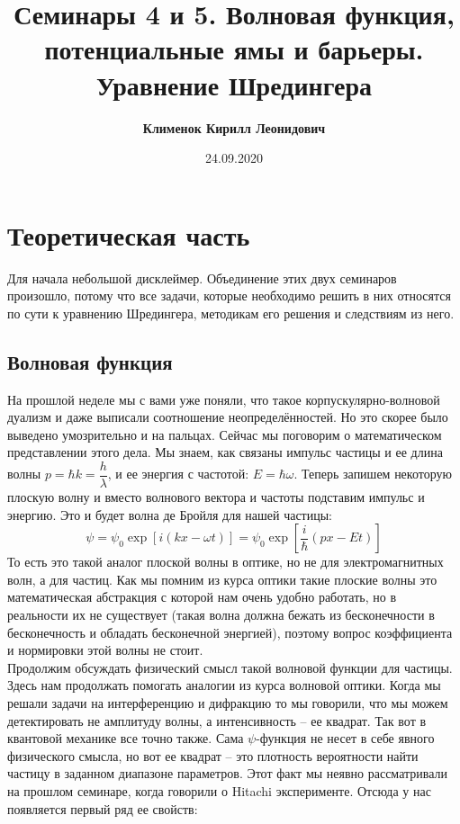 \documentclass[12pt]{article}
\begin{document}
 
\title{\textbf{Семинары 4 и 5. Волновая функция, потенциальные ямы и барьеры. Уравнение Шредингера}}
\author{\textbf{Клименок Кирилл Леонидович}}
\date{24.09.2020}
\maketitle
\section{Теоретическая часть}
Для начала небольшой дисклеймер. Объединение этих двух семинаров произошло, потому что все задачи, которые необходимо решить в них относятся по сути к уравнению Шредингера, методикам его решения и следствиям из него. 
\subsection{Волновая функция}
На прошлой неделе мы с вами уже поняли, что такое корпускулярно-волновой дуализм и даже выписали соотношение неопределённостей. Но это скорее было выведено умозрительно и на пальцах. Сейчас мы поговорим о математическом представлении этого дела. Мы знаем, как связаны импульс частицы и ее длина волны $p  = \hbar k = \dfrac{h}{\lambda}$, и ее энергия с частотой: $E  = \hbar \omega$. Теперь запишем некоторую плоскую волну и вместо волнового вектора и частоты подставим импульс и энергию. Это и будет волна де Бройля для нашей частицы:
\begin{equation}
\label{eq:sem_04_psi}
    \psi = \psi_0 \exp{\left[i\left(kx - \omega t \right)\right]} =\psi_0 \exp{\left[\dfrac{i}{\hbar}\left(px - Et \right)\right]}
\end{equation}
То есть это такой аналог плоской волны в оптике, но не для электромагнитных волн, а для частиц. Как мы помним из курса оптики такие плоские волны это математическая абстракция с которой нам очень удобно работать, но в реальности их не существует (такая волна должна бежать из бесконечности в бесконечность и обладать бесконечной энергией), поэтому вопрос коэффициента и нормировки этой волны не стоит. 
\\
Продолжим обсуждать физический смысл такой волновой функции для частицы. Здесь нам продолжать помогать аналогии из курса волновой оптики. Когда мы решали задачи на интерференцию и дифракцию то мы говорили, что мы можем детектировать не амплитуду волны, а интенсивность -- ее квадрат. Так вот в квантовой механике все точно также. Сама $\psi$-функция  не несет в себе явного физического смысла, но вот ее квадрат -- это плотность вероятности найти частицу в заданном диапазоне параметров. Этот факт мы неявно рассматривали на прошлом семинаре, когда говорили о Hitachi эксперименте.  Отсюда у нас появляется первый ряд ее свойств:
\end{document}
